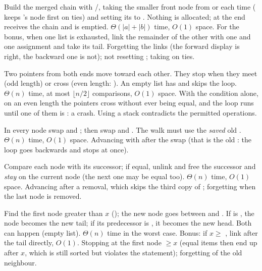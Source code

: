\idea Build the merged chain with /, taking the smaller front node from
 or  each time (\cc{<=} keeps 's node first on ties) and setting its
 to . Nothing is allocated; at the end  receives the chain and
 is emptied.
\complexity $\Theta(|a|+|b|)$ time, $O(1)$ space. For the bonus, when one list is
exhausted, link the remainder of the other with one  and one 
assignment and take its tail.
\mistakes Forgetting the  links (the forward display is right, the backward one
is not); not resetting ; taking  on ties.

\idea Two pointers from both ends move toward each other. They stop when they meet (odd
length) or cross (even length: ). An empty list has
 and skips the loop.
\complexity $\Theta(n)$ time, at most $\lfloor n/2\rfloor$ comparisons, $O(1)$ space.
\mistakes With the condition  alone, on an even length the pointers
cross without ever being equal, and the loop runs until one of them is :
a crash. Using a stack contradicts the permitted operations.

\idea In every node swap  and ; then swap  and . The
walk must use the \emph{saved} old .
\complexity $\Theta(n)$ time, $O(1)$ space.
\mistakes Advancing with  after the swap (that is the old
: the loop goes backwards and stops at once).

\idea Compare each node with its successor; if equal, unlink and free the successor and
\emph{stay} on the current node (the next one may be equal too).
\complexity $\Theta(n)$ time, $O(1)$ space.
\mistakes Advancing after a removal, which skips the third copy of ; forgetting
 when the last node is removed.

\idea Find the first node greater than $x$ (); the new node goes between
 and . If  is , the node becomes the new tail; if
its predecessor is , it becomes the new head. Both can happen (empty list).
\complexity $\Theta(n)$ time in the worst case. Bonus: if $x\ge$ , link
after the tail directly, $O(1)$.
\mistakes Stopping at the first node $\ge x$ (equal items then end up after $x$, which
is still sorted but violates the statement); forgetting  of the old neighbour.

